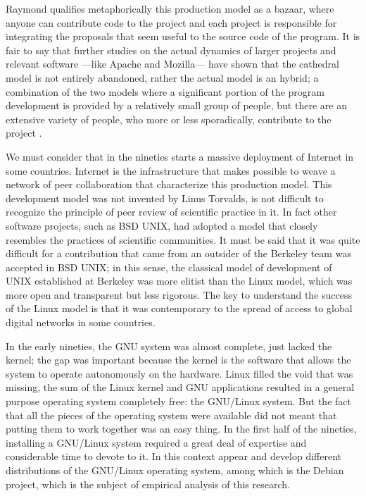 Raymond qualifies metaphorically this production model as a bazaar, where anyone can contribute code to the project and each project is responsible for integrating the proposals that seem useful to the source code of the program. It is fair to say that further studies on the actual dynamics of larger projects and relevant software ---like Apache and Mozilla--- have shown that the cathedral model is not entirely abandoned, rather the actual model is an hybrid; a combination of the two models where a significant portion of the program development is provided by a relatively small group of people, but there are an extensive variety of people, who more or less sporadically, contribute to the project \citep{mockus:2002}.

We must consider that in the nineties starts a massive deployment of Internet in some countries. Internet is the infrastructure that makes possible to weave a network of peer collaboration that characterize this production model. This development model was not invented by Linus Torvalds, is not difficult to recognize the principle of peer review of scientific practice in it. In fact other software projects, such as BSD UNIX, had adopted a model that closely resembles the practices of scientific communities. It must be said that it was quite difficult for a contribution that came from an outsider of the Berkeley team was accepted in BSD UNIX; in this sense, the classical model of development of UNIX established at Berkeley was more elitist than the Linux model, which was more open and transparent but less rigorous. The key to understand the success of the Linux model is that it was contemporary to the spread of access to global digital networks in some countries.

In the early nineties, the GNU system was almost complete, just lacked the kernel; the gap was important because the kernel is the software that allows the system to operate autonomously on the hardware. Linux filled the void that was missing, the sum of the Linux kernel and GNU applications resulted in a general purpose operating system completely free: the GNU/Linux system. But the fact that all the pieces of the operating system were available did not meant that putting them to work together was an easy thing. In the first half of the nineties, installing a GNU/Linux system required a great deal of expertise and considerable time to devote to it. In this context appear and develop different distributions of the GNU/Linux operating system, among which is the Debian project, which is the subject of empirical analysis of this research.


